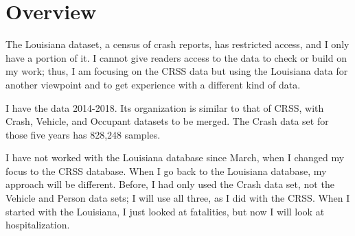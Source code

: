 \section{Overview}


The Louisiana dataset, a census of crash reports, has restricted access, and I only have a portion of it.  I cannot give readers access to the data to check or build on my work; thus, I am focusing on the CRSS data but using the Louisiana data for another viewpoint and to get experience with a different kind of data.  

I have the data 2014-2018.  Its organization is similar to that of CRSS, with Crash, Vehicle, and Occupant datasets to be merged.  The Crash data set for those five years has 828,248 samples.  

I have not worked with the Louisiana database since March, when I changed my focus to the CRSS database.  When I go back to the Louisiana database, my approach will be different.  Before, I had only used the Crash data set, not the Vehicle and Person data sets; I will use all three, as I did with the CRSS.   When I started with the Louisiana, I just looked at fatalities, but now I will look at hospitalization.  


